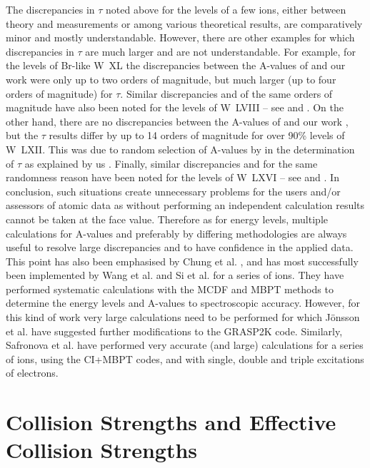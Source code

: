 \documentclass[fleqn]{article}
\begin{document}
The discrepancies in $\tau$ noted above for the levels of a few ions, either between theory and measurements or among various theoretical results, are comparatively minor and mostly understandable. However, there are other examples for which discrepancies in $\tau$ are much larger and are not understandable. For example, for the levels of Br-like W~XL the discrepancies between the A-values of \cite{mmw40} and our work \cite{w40a} were only up to two orders of magnitude, but much larger (up to four orders of magnitude) for $\tau$. Similar discrepancies and of the same orders of magnitude have also been noted for the levels of W~LVIII -- see \cite{w58a} and \cite{mmw58}. On the other hand, there are no discrepancies between the A-values of \cite{mmw62} and our work \cite{w62a}, but the $\tau$ results differ by up to 14 orders of magnitude for over 90\% levels of W~LXII. This was due to random selection of A-values by \cite{mmw62} in the determination of $\tau$ as explained by us \cite{w62a}. Finally, similar discrepancies and for the same randomness reason have been noted for the levels of W~LXVI -- see \cite{mmw66} and \cite{w66b}. In conclusion, such   situations create unnecessary problems for the users and/or assessors of atomic data as without performing an independent calculation  results cannot be taken at the face value. Therefore as for energy levels, multiple calculations for A-values and preferably by differing methodologies are always useful to resolve large discrepancies and to have confidence in the applied data.  This point has also been emphasised by Chung et al. \cite{iaea}, and has most successfully been implemented by Wang et al. \cite{wang1, wang2, wang3} and Si et al. \cite{si} for a series of ions. They have performed systematic calculations with the MCDF and MBPT methods to determine the energy levels and A-values to spectroscopic accuracy. However, for this kind of work very large calculations need to be performed for which J\"{o}nsson et al. \cite{alex} have suggested further modifications to the GRASP2K code. Similarly, Safronova et al. \cite{saf1, saf2} have performed very accurate (and large) calculations for a series of ions, using the CI+MBPT codes, and with single, double and triple excitations of electrons. 

\section{Collision Strengths and Effective Collision Strengths}
\end{document}
